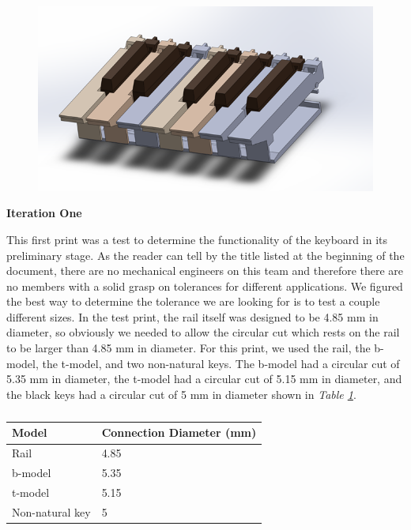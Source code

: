 \begin{figure}[h!]
  \centering
  \includegraphics[width=0.9\linewidth]{image/AssembledModel.png}
  \caption{}
  \label{fig:assembled_model}
\end{figure}

\textbf{Iteration One}

This first print was a test to determine the functionality of the keyboard in its preliminary stage. As the reader can tell by the title listed at the beginning of the document, there are no mechanical engineers on this team and therefore there are no members with a solid grasp on tolerances for different applications. We figured the best way to determine the tolerance we are looking for is to test a couple different sizes. In the test print, the rail itself was designed to be 4.85 mm in diameter, so obviously we needed to allow the circular cut which rests on the rail to be larger than 4.85 mm in diameter. For this print, we used the rail, the b-model, the t-model, and two non-natural keys. The b-model had a circular cut of 5.35 mm in diameter, the t-model had a circular cut of 5.15 mm in diameter, and the black keys had a circular cut of 5 mm in diameter shown in \textit{Table \ref{Tab:connections}}.

\begin{table}[]
  \centering
  \begin{tabular}{|l|l|}
    \hline
    Model           & Connection Diameter (mm) \\ \hline
    Rail            & 4.85                     \\ \hline
    b-model         & 5.35                     \\ \hline
    t-model         & 5.15                     \\ \hline
    Non-natural key & 5                        \\ \hline
  \end{tabular}
  \caption{}
  \label{Tab:connections}
\end{table}

